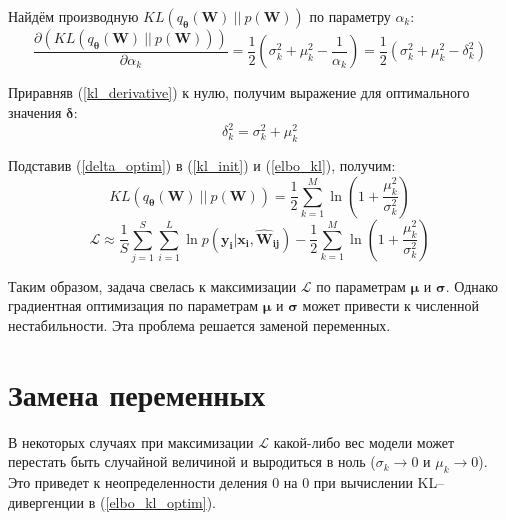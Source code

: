 \documentclass{article}
\numberwithin{equation}{section}
\begin{document}
    Найдём производную $KL(q_{\pmb{\theta}}(\pmb{W})~||~p(\pmb{W}))$ по параметру $\alpha_k$:
    \begin{equation}\label{kl_derivative}
        \frac
            {\partial (KL(q_{\pmb{\theta}}(\pmb{W})~||~p(\pmb{W})))}
            {\partial {\alpha_k}}
        =
            \frac{1}{2} \left(
                \sigma_{k}^2 + \mu_{k}^2 - \dfrac{1}{\alpha_k}
            \right)
        =
            \frac{1}{2} \left(
                \sigma_{k}^2 + \mu_{k}^2 - \delta_{k}^2
            \right)
    \end{equation}

    Приравняв (\ref{kl_derivative}) к нулю, получим выражение для оптимального значения $\pmb{\delta}$:
    \begin{equation}\label{delta_optim}
        \delta_{k}^2 = \sigma_{k}^2 + \mu_{k}^2
    \end{equation}

    Подставив (\ref{delta_optim}) в (\ref{kl_init}) и (\ref{elbo_kl}), получим:
    \begin{equation}\label{kl_optim}
    KL(
        q_{\pmb{\theta}}(\pmb{W})~||~p(\pmb{W})
    )
    =
        \frac{1}{2} \sum_{k=1}^{M} {
            \ln \left(
                {1 + \frac{\mu_{k}^2}{\sigma_{k}^2}}
            \right)
        }
    \end{equation}
    \begin{equation}\label{elbo_kl_optim}
        \mathcal{L}
        \approx
            \frac{1}{S} \sum_{j=1}^S \sum_{i=1}^{L} {
                \ln{
                    p(\pmb{y_{i}} | \pmb{x_{i}}, \pmb{\hat{W}_{ij}})
                }
            }
        -
            \frac{1}{2} \sum_{k=1}^{M} {
                \ln \left(
                    {1 + \frac{\mu_{k}^2}{\sigma_{k}^2}}
                \right)
            }
    \end{equation}

    Таким образом, задача свелась к максимизации $\mathcal{L}$
    по параметрам $\pmb{\mu}$ и $\pmb{\sigma}$.
    Однако градиентная оптимизация по параметрам $\pmb{\mu}$ и $\pmb{\sigma}$ может привести
    к численной нестабильности. Эта проблема решается заменой переменных.

    \section{Замена переменных}

    В некоторых случаях при максимизации $\mathcal{L}$
    какой-либо вес модели может перестать быть случайной величиной
    и выродиться в ноль
    ($\sigma_{k} \rightarrow 0$ и $\mu_{k} \rightarrow 0$).
    Это приведет к неопределенности деления 0 на 0
    при вычислении KL--дивергенции в (\ref{elbo_kl_optim}).
\end{document}
